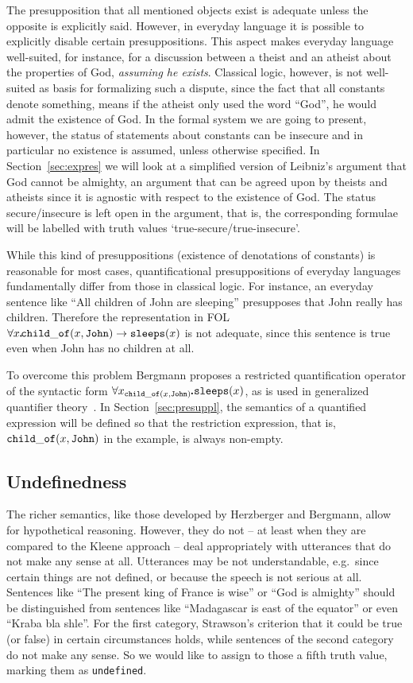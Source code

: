 \documentclass{\filespath jancl}
\def\sdot{\rule{.3ex}{.3ex}\hspace{-0.4ex}\;} %
\newcommand{\all}[3]{\forall {#1}_{#2}\sdot #3}
\def\sf{\tt}
\begin{document}
The presupposition that all mentioned objects exist is adequate unless
the opposite is explicitly said.  However, in everyday language it is
possible to explicitly disable certain presuppositions. This aspect
makes everyday language well-suited, for instance, for a discussion
between a theist and an atheist about the properties of God, {\em
  assuming he exists}.  Classical logic, however, is not well-suited
as basis for formalizing such a dispute, since the fact that all
constants denote something, means if the atheist only used the word
``God'', he would admit the existence of God. In the formal system we
are going to present, however, the status of statements about
constants can be insecure and in particular no existence is assumed,
unless otherwise specified. In Section~\ref{sec:expres} we will look
at a simplified version of Leibniz's argument that God cannot be
almighty, an argument that can be agreed upon by theists and atheists
since it is agnostic with respect to the existence of God. The status
secure/insecure is left open in the argument, that is, the
corresponding formulae will be labelled with truth values
`true-secure/true-insecure'.

While this kind of presuppositions (existence of denotations of constants) is reasonable for most cases,
quantificational presuppositions of everyday languages fundamentally differ from those in
classical logic.  For instance, an everyday sentence like ``All children of John are
sleeping'' presupposes that John really has children. Therefore the representation in FOL
$\all{x}{}{{\sf\!  child\_of}(x,{\sf John}) \implies {\sf sleeps}(x)}$ is not adequate,
since this sentence is true even when John has no children at all.

To overcome this problem Bergmann proposes a restricted quantification
operator of the syntactic form $\all{x}{{\sf child\_of}(x,{\sf
    John})}{{\sf sleeps}(x)}$, as is used in generalized quantifier
theory~\cite{BarCoo:gqnl81,Mostowski57}.  In Section~\ref{sec:presuppl}, the
semantics of a quantified expression will be defined so that the restriction
expression, that is, ${\sf child\_of}(x,{\sf John})$ in the example, is always
non-empty.

\subsection{Undefinedness}
The richer semantics, like those developed by Herzberger and Bergmann,
allow for hypothetical reasoning. However, they do not -- at least
when they are compared to the Kleene approach -- deal appropriately
with utterances that do not make any sense at all. Utterances may
be not understandable, e.g.\ since certain things are not defined, or
because the speech is not serious at all.  Sentences like ``The
present king of France is wise'' or ``God is almighty'' should be
distinguished from sentences like ``Madagascar is east of the
equator'' or even ``Kraba bla shle''.  For the first category,
Strawson's criterion that it could be true (or false) in certain
circumstances holds, while sentences of the second category do not
make any sense.  So we would like to assign to those a fifth truth
value, marking them as {\sf undefined}. 
\end{document}
